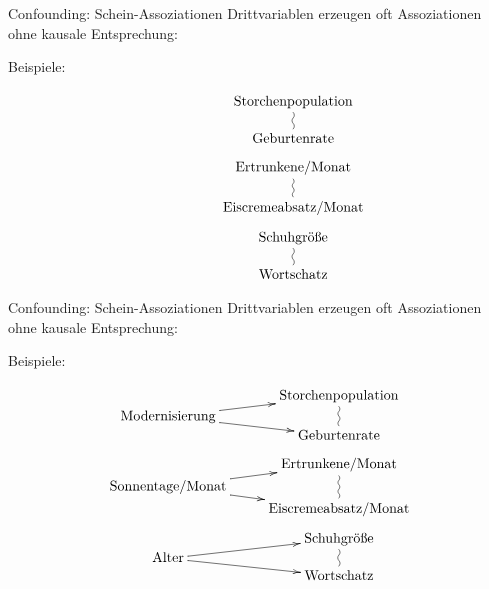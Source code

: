 \documentclass[
  10pt,
  ignorenonframetext,
]{beamer}
\begin{document}
\begin{frame}{Confounding: Schein-Assoziationen}
\label{confounding-schein-assoziationen}
Drittvariablen erzeugen oft Assoziationen ohne kausale Entsprechung:

Beispiele:

\begin{small}
\begin{displaymath}
\xymatrix@R-2pc{
                         &  \text{Storchenpopulation}\ar@{~}[dd]\\
       {\phantom{XX}}  &  \\
                         & \text{Geburtenrate}\\
                         & \\
                         &  \text{Ertrunkene/Monat}\ar@{~}[dd]\\
         {\phantom{XX}} &  \\
                         & \text{Eiscremeabsatz/Monat}\\
                         & \\
                         &  \text{Schuhgröße}\ar@{~}[dd]\\
         {\phantom{XX}} &  \\
                         & \text{Wortschatz}}
\end{displaymath}
\end{small}
\end{frame}

\begin{frame}{Confounding: Schein-Assoziationen}
\label{confounding-schein-assoziationen-1}
Drittvariablen erzeugen oft Assoziationen ohne kausale Entsprechung:

Beispiele:

\begin{small}
\begin{displaymath}
\xymatrix@R-2pc{
                         &  \text{Storchenpopulation}\ar@{~}[dd]\\
        \text{Modernisierung} \ar[dr]\ar[ur] &  \\
                         & \text{Geburtenrate}\\
                         & \\
                         &  \text{Ertrunkene/Monat}\ar@{~}[dd]\\
        \text{Sonnentage/Monat} \ar[dr]\ar[ur] &  \\
                         & \text{Eiscremeabsatz/Monat}\\
                         &  \\
                         &  \text{Schuhgröße}\ar@{~}[dd]\\
        \text{Alter} \ar[dr]\ar[ur] &  \\
                         & \text{Wortschatz}}
\end{displaymath}
\end{small}
\end{frame}
\end{document}
